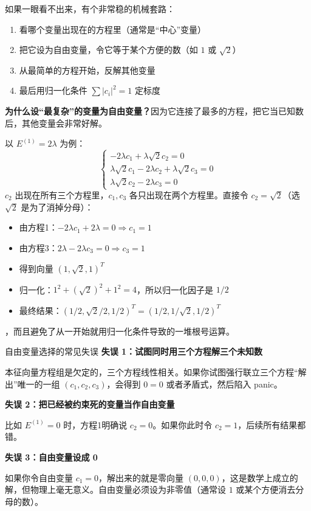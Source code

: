 \begin{tipbox}
如果一眼看不出来，有个非常稳的机械套路：
\begin{enumerate}[nosep]
    \item 看哪个变量出现在的方程里（通常是``中心''变量）
    \item 把它设为自由变量，令它等于某个方便的数（如 $1$ 或 $\sqrt{2}$）
    \item 从最简单的方程开始，反解其他变量
    \item 最后用归一化条件 $\sum |c_i|^2 = 1$ 定标度
\end{enumerate}

\textbf{为什么设``最复杂''的变量为自由变量？}因为它连接了最多的方程，把它当已知数后，其他变量会非常好解。

以 $E^{(1)} = 2\lambda$ 为例：
\[
\begin{cases}
-2\lambda c_1 + \lambda\sqrt{2} c_2 = 0 \\
\lambda\sqrt{2} c_1 - 2\lambda c_2 + \lambda\sqrt{2} c_3 = 0 \\
\lambda\sqrt{2} c_2 - 2\lambda c_3 = 0
\end{cases}
\]
$c_2$ 出现在所有三个方程里，$c_1, c_3$ 各只出现在两个方程里。直接令 $c_2 = \sqrt{2}$（选 $\sqrt{2}$ 是为了消掉分母）：
\begin{itemize}[nosep]
    \item 由方程1：$-2\lambda c_1 + 2\lambda = 0 \Rightarrow c_1 = 1$
    \item 由方程3：$2\lambda - 2\lambda c_3 = 0 \Rightarrow c_3 = 1$
    \item 得到向量 $(1, \sqrt{2}, 1)^T$
    \item 归一化：$1^2 + (\sqrt{2})^2 + 1^2 = 4$，所以归一化因子是 $1/2$
    \item 最终结果：$(1/2, \sqrt{2}/2, 1/2)^T = (1/2, 1/\sqrt{2}, 1/2)^T$
\end{itemize}

，而且避免了从一开始就用归一化条件导致的一堆根号运算。
\end{tipbox}

\begin{errorbox}[colback=white]{自由变量选择的常见失误}
\textbf{失误 1：试图同时用三个方程解三个未知数}

本征向量方程组是欠定的，三个方程线性相关。如果你试图强行联立三个方程``解出''唯一的一组 $(c_1, c_2, c_3)$，会得到 $0=0$ 或者矛盾式，然后陷入 panic。

\textbf{失误 2：把已经被约束死的变量当作自由变量}

比如 $E^{(1)}=0$ 时，方程1明确说 $c_2=0$。如果你此时令 $c_2=1$，后续所有结果都错。

\textbf{失误 3：自由变量设成 0}

如果你令自由变量 $c_1 = 0$，解出来的就是零向量 $(0,0,0)$，这是数学上成立的解，但物理上毫无意义。自由变量必须设为非零值（通常设 $1$ 或某个方便消去分母的数）。
\end{errorbox}

